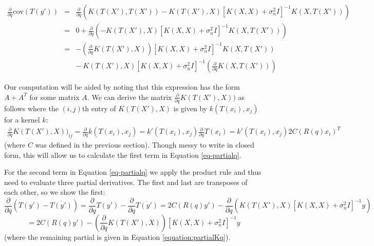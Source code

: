 \documentclass{article} %
\begin{document}
\begin{eqnarray}
\frac{\partial}{\partial q} \mbox{cov}(T(y')) &=& \frac{\partial}{\partial q} (K(T(X'),T(X')) - K(T(X'),X)[K(X,X) + \sigma_n^2 I]^{-1} K(X,T(X'))) \nonumber\\
&=& 0 + \frac{\partial}{\partial q} (- K(T(X'),X)[K(X,X) + \sigma_n^2 I]^{-1} K(X,T(X'))) \nonumber\\
&=& - \left(\frac{\partial}{\partial q} K(T(X'),X)\right) \left[K(X,X) + \sigma_n^2 I\right]^{-1} K(X,T(X')) \nonumber\\
&&  - ~ K(T(X'),X) [K(X,X) + \sigma_n^2 I]^{-1} \left(\frac{\partial}{\partial q} K(X,T(X'))\right) \label{eq-covpartialq}
\end{eqnarray}
 

Our computation will be aided by noting that this expression has the form $A + A^T$ for some matrix $A$. We can derive the matrix $\frac{\partial}{\partial q} K(T(X'),X))$ as follows where the $(i,j)$th entry of $K(T(X'),X)$ is given by $k(T(x_i), x_j)$ for a kernel $k$:
\begin{eqnarray}
\frac{\partial}{\partial q} K(T(X'),X))_{ij} = \frac{\partial}{\partial q} k(T(x_i), x_j) = k'(T(x_i), x_j) \frac{\partial}{\partial q} T(x_i) = k'(T(x_i), x_j) 2C(R(q)x_i)^T
\label{equation:partialKq}
\end{eqnarray}
(where $C$ was defined in the previous section).
Though messy to write in closed form, this will allow us to calculate the first term in Equation \ref{eq-partialq}.

For the second term in Equation \ref{eq-partialq} we apply the product rule and thus need to evaluate three partial derivatives. The first and last are transposes of each other, so we show the first:
$$\frac{\partial}{\partial q} (T(y') - \overline{T(y')}) = \frac{\partial}{\partial q} T(y') - \frac{\partial}{\partial q} \overline{T(y')}
=  2C(R(q)y') - \frac{\partial}{\partial q} (K(T(X'),X)[K(X,X) + \sigma_n^2 I]^{-1} y)$$
$$= 2C(R(q)y') - \left(\frac{\partial}{\partial q} K(T(X'),X)\right)\left[K(X,X) + \sigma_n^2 I\right]^{-1} y$$
(where the remaining partial is given in Equation \ref{equation:partialKq}).
\end{document}
